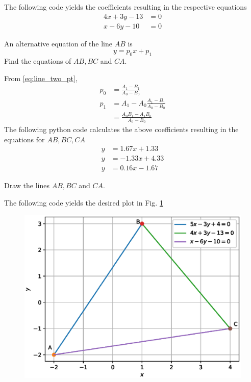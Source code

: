 \documentclass[journal,12pt,twocolumn]{IEEEtran}
\begin{document}
\solution
The following code yields the coefficients resulting in the respective equations
%
\begin{align}
4x + 3y -13 &= 0
\\
x - 6y - 10 &= 0
\end{align}
%

\begin{problem}
An alternative equation of the line $AB$ is
\begin{equation}
y = p_0x + p_1 
\end{equation}
%
Find the equations of $AB,BC$ and $CA$.
\end{problem}
\solution From \eqref{eq:line_two_pt},
\begin{align}
p_0 &= \frac{A_1 \! - \! B_1}{A_0 \! - \! B_0} 
\\
p_1 &= A_1 - A_0\frac{A_1 \! - \! B_1}{A_0 \! - \! B_0} 
\nonumber\\
&= \frac{A_0 B_1 - A_1B_0}{A_0 \! - \! B_0} 
\end{align}
%
The following python code calculates the above coefficients resulting in the equations for $AB,BC,CA$
\begin{align}
y &=1.67x +1.33
\\
y &=-1.33x + 4.33
\\
y &=0.16x -1.67
\end{align}
\begin{problem}
Draw the lines $AB,BC$ and $CA$.
\end{problem}
\solution
The following code yields the desired plot in Fig. \ref{fig:triangle_def}

\begin{figure}
\centering
\includegraphics[width=\columnwidth]{./figs/triangle.eps}
\caption{}
\label{fig:triangle_def}
\end{figure}
%
\end{document}

